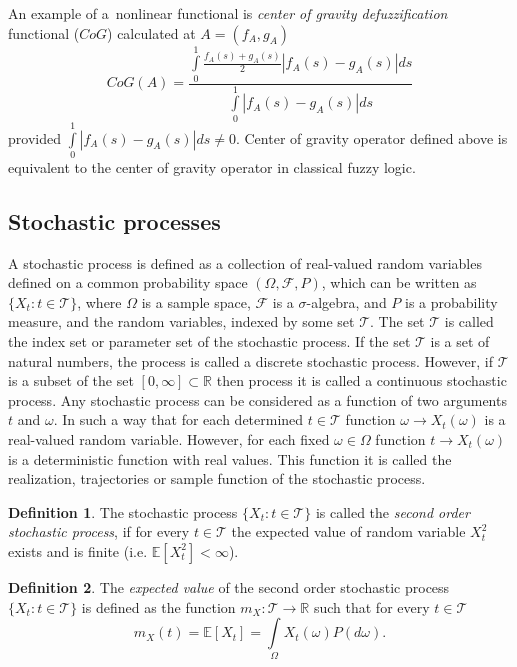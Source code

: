 \documentclass[review]{elsarticle}
\theoremstyle{definition}
\newtheorem{definition}{Definition}[section]
\theoremstyle{theorem}
\begin{document}
An example of a~nonlinear functional is {\em center of gravity defuzzification} functional ($CoG$) calculated at $A=(f_A,g_A)$
\begin{equation}
\label{eq:cog}
CoG(A)=\frac{\int\limits_0^1\frac{f_A(s)+g_A(s)}{2}|f_A(s)-g_A(s)|ds}{\int\limits_0^1|f_A(s)-g_A(s)|ds}
\end{equation}
provided $\int\limits_0^1|f_A(s)-g_A(s)|ds\neq0$. Center of gravity operator defined above is equivalent to the center of gravity operator in classical fuzzy logic.

\subsection{Stochastic processes}
A stochastic process is defined as a collection of real-valued random  variables defined on a  common  probability  space $(\Omega, \mathcal{F}, P)$, which can be written as $\{X_t\colon t\in\mathcal{T}\}$, where $\Omega$ is  a  sample  space, $\mathcal{F}$ is a $\sigma$-algebra, and $P$ is a probability measure, and the random variables, indexed by some set $\mathcal{T}$. The set $\mathcal{T}$ is called the index set  or parameter set of the stochastic process. If the set $\mathcal{T}$ is a set of natural numbers, the process is called a discrete stochastic process. However, if $\mathcal{T}$ is a subset of the set $[0, \infty] \subset\mathbb{R}$ then process it is called a continuous stochastic process. Any stochastic process can be considered as a function of two arguments $t$ and $\omega$. In such a way that for each determined $t\in\mathcal{T}$ function $\omega\to X_t(\omega)$ is a real-valued random variable. However, for each fixed $\omega \in \Omega$ function $t\to X_t(\omega)$ is a deterministic function with real values. This function it is called the realization, trajectories or sample function of the stochastic process.\cite{florescu2014, Minier2014, GABBIANI2017}

\begin{definition}
The stochastic process $\{X_t\colon t\in\mathcal{T}\}$ is called the {\it second order stochastic process}, if for every $t\in\mathcal{T}$ the expected value of random variable $X_t^2$ exists and is finite (i.e. $\mathbb{E}[X_t^2]<\infty$).
\end{definition}

\begin{definition}
The {\it expected value} of the second order stochastic process $\{X_t\colon t\in\mathcal{T}\}$ is defined as the function $m_X\colon\mathcal{T} \to\mathbb{R}$ such that for every $t\in\mathcal{T}$
\begin{equation}
m_X(t) = \mathbb{E}[X_t] = \int\limits_{\Omega}X_t(\omega)P(d\omega).
\end{equation}
\end{definition}
\end{document}
